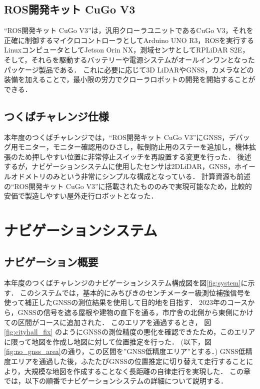\documentclass[platex,dvipdfmx]{rbproceedings}
\begin{document}
\subsection{ROS開発キット CuGo V3}
“ROS開発キット CuGo V3”は，汎用クローラユニットであるCuGo V3，それを正確に制御するマイクロコントローラとしてArduino UNO R3，ROSを実行するLinuxコンピュータとしてJetson Orin NX，測域センサとしてRPLiDAR S2E，そして，それらを駆動するバッテリーや電源システムがオールインワンとなったパッケージ製品である．
これに必要に応じて3D LiDARやGNSS，カメラなどの装備を加えることで，最小限の労力でクローラロボットの開発を開始することができる．
%
%


\subsection{つくばチャレンジ仕様}
本年度のつくばチャレンジでは，“ROS開発キット CuGo V3”にGNSS，デバッグ用モニター，モニター確認用のひさし，転倒防止用のステーを追加し，機体拡張のため押しやすい位置に非常停止スイッチを再設置する変更を行った．
後述するが，ナビゲーションシステムに使用したセンサは2DLiDAR，GNSS，ホイールオドメトリのみという非常にシンプルな構成となっている．
計算資源も前述の“ROS開発キット CuGo V3”に搭載されたもののみで実現可能なため，比較的安価で製造しやすい屋外走行ロボットとなった．

\section{ナビゲーションシステム}
\subsection{ナビゲーション概要}
本年度のつくばチャレンジのナビゲーションシステム構成図を図\ref{fig:system}に示す．
このシステムでは，基本的にみちびきのセンチメーター級測位補強信号を使って補正したGNSSの測位結果を使用して目的地を目指す．
2023年のコースから，GNSSの信号を遮る屋根や建物の直下を通る，市庁舎の北側から東側にかけての区間がコースに追加された．
このエリアを通過するとき， 図\ref{fig:cityhall_fix} のようにGNSSの測位精度の悪化を確認できたため，このエリアに限って地図を作成し地図に対して位置推定を行った．
(以下，図\ref{fig:no_gnss_area}の通り，この区間を”GNSS低精度エリア”とする．)
GNSS低精度エリアを通過した後，ふたたびGNSSの位置推定に切り替えて走行することにより，大規模な地図を作成することなく長距離の自律走行を実現した．
この章では，以下の順番でナビゲーションシステムの詳細について説明する．
\end{document}
